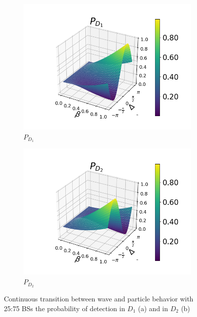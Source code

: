 \documentclass[12pt]{book}
\begin{document}
\begin{figure}[t!]
\centering
\begin{subfigure}[b]{0.40\linewidth}
\includegraphics[width=\linewidth]{images/pd1_2_pi3.png}
\caption{$P_{D_{1}}$}
\end{subfigure}
\begin{subfigure}[b]{0.40\linewidth}
\includegraphics[width=\linewidth]{images/pd2_2_pi3.png}
\caption{$P_{D_{2}}$ }
\label{fig:BS1}
\end{subfigure}
\caption{Continuous transition between wave and particle behavior with 25:75 BSs the probability of detection in $D_{1}$ (a) and in $D_{2}$ (b)}
\label{pi/3}
\end{figure}
\end{document}
